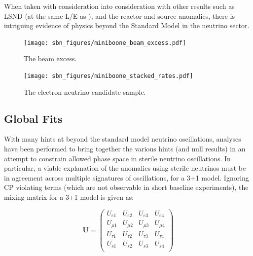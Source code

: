 When taken with consideration into consideration with other results such as LSND (at the same L/E as \MB), and the reactor and source anomalies, there is intriguing evidence of physics beyond the Standard Model in the neutrino sector.


\begin{figure}[htbp]
  \centering
  \texttt{[image: sbn\_figures/miniboone\_beam\_excess.pdf]}
  \caption[\MB Beam Excess]{The \MB beam excess.}
  \label{fig:mb_beam_excess}
\end{figure}

\begin{figure}[htbp]
  \centering
  \texttt{[image: sbn\_figures/miniboone\_stacked\_rates.pdf]}
  \caption[\MB Stacked Rates]{The \MB electron neutrino candidate sample.}
  \label{fig:mb_stacked_rates}
\end{figure}

\subsection{Global Fits}
\label{sec:global_fits}

With many hints at beyond the standard model neutrino oscillations, analyses have been performed to bring together the various hints (and null results) in an attempt to constrain allowed phase space in sterile neutrino oscillations.  In particular, a viable explanation of the anomalies using sterile neutrinos must be in agreement across multiple signatures of oscillations, for a 3+1 model.  Ignoring CP violating terms (which are not observable in short baseline experiments), the mixing matrix for a 3+1 model is given as:

\begin{equation*}
\mathbf{U} = \left(
\begin{array}{cccc}
U_{e1} & U_{e2} & U_{e3} & U_{e4}  \\
U_{\mu1} & U_{\mu2} & U_{\mu3} & U_{\mu4}  \\
U_{\tau1} & U_{\tau2} & U_{\tau3} & U_{\tau4}  \\
U_{s1} & U_{s2} & U_{s3} & U_{s4}  \\
\end{array} \right)
\end{equation*}

